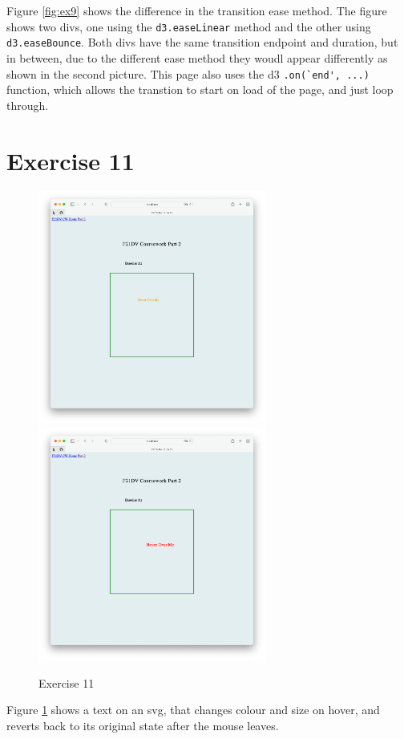 \documentclass{scrreprt}
\begin{document}
\FloatBarrier
% 
Figure \ref{fig:ex9} shows the difference in the transition ease method. The figure shows two divs, one using the \verb|d3.easeLinear| method and the other using \verb|d3.easeBounce|. Both divs have the same transition endpoint and duration, but in between, due to the different ease method they woudl appear differently as shown in the second picture. This page also uses the d3 \verb|.on(`end', ...)| function, which allows the transtion to start on load of the page, and just loop through.

\newpage
\section{Exercise 11}
\begin{figure}[!ht]
    \centering
    \includegraphics[width = 7.5cm]{images/ex11_1.png}
    \includegraphics[width = 7.5cm]{images/ex11_2.png}
    \label{fig:ex11}
    \caption{Exercise 11}
\end{figure}
\FloatBarrier
% 
Figure \ref{fig:ex11} shows a text on an svg, that changes colour and size on hover, and reverts back to its original state after the mouse leaves.
\end{document}
